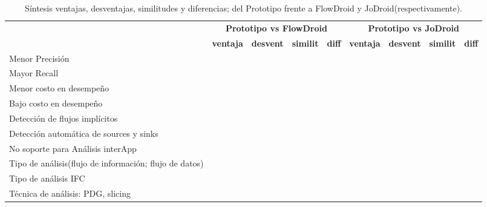 \begin{table}[H]
\small\addtolength{\tabcolsep}{-3pt}
\begin{tabular}{|p{4cm}|p{1cm}|p{1cm}|p{1cm}|p{1cm}|p{1cm}|p{1cm}|p{1cm}|p{1cm}|}
	\hline
	{\multirow{2}{*}{\textbf{Item}}}
	&\multicolumn{4}{c|}{\cellcolor{gray!30}\textbf{Prototipo vs FlowDroid}} &
	\multicolumn{4}{c|}{\cellcolor{gray!55}\textbf{Prototipo vs JoDroid}}\\
	\cline{2-9}
	 & \cellcolor{gray!30}\tiny{\textbf{ventaja}} &
	 \cellcolor{gray!30}\tiny{\textbf{desvent}} &
	 \cellcolor{gray!30}\tiny{\textbf{similit}}&
	 \cellcolor{gray!30}\tiny{\textbf{diff}} &
	 \cellcolor{gray!55}\tiny{\textbf{ventaja}} &
	 \cellcolor{gray!55}\tiny{\textbf{desvent}} &
	 \cellcolor{gray!55}\tiny{\textbf{similit}}&
	 \cellcolor{gray!55}\tiny{\textbf{diff}}\\
	\hline
	\footnotesize{Menor Precisión} & &\checkmark & & & &\checkmark& &\\
	\hline
	Mayor Recall &\checkmark& & & &\checkmark& & &\\
	\hline
	Menor costo en desempeño & & & & &\checkmark& & &\\
	\hline
	Bajo costo en desempeño & & &\checkmark& & & & & \\
	\hline
	Detección de flujos implícitos & \checkmark& & & & & &\checkmark&\\
	\hline
	Detección automática de sources y sinks & & &\checkmark& &\checkmark& & & \\
	\hline
	No soporte para Análisis interApp & &\checkmark& & & & &\checkmark&\\
	\hline
	\footnotesize{Tipo de análisis(flujo de información; flujo de datos)} & & &
	&\checkmark& & & &\\
	\hline
	Tipo de análisis IFC & & & & & & &\checkmark&\\
	\hline
	Técnica de análisis: PDG, slicing & & & & & & & &\checkmark\\
	\hline
\end{tabular}
\caption{Síntesis ventajas, desventajas, similitudes y diferencias; del
Prototipo frente a FlowDroid y JoDroid(respectivamente).\newline}
\label{tab:comparacion}
\end{table}

